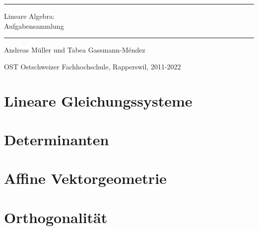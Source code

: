 \documentclass[a4paper,12pt]{book}
\begin{document}
\pagestyle{fancy}
\rhead{}
\frontmatter
\newcommand\HRule{\noindent\rule{\linewidth}{1.5pt}}
\begin{titlepage}
\HRule
\vspace*{2pt}
\begin{flushright}
{\Huge
Lineare Algebra:\\
\bigskip
Aufgabensammlung}
\end{flushright}
\HRule
\begin{flushright}
\vspace{30pt}
\LARGE
Andreas Müller
und
Tabea Gassmann-Méndez
\end{flushright}
\begin{center}
OST Ostschweizer Fachhochschule, Rapperswil, 2011-2022
\end{center}
\end{titlepage}
\tableofcontents
\newenvironment{beispiel}[1][Beispiel]{%
\begin{proof}[#1]%
\renewcommand{\qedsymbol}{$\bigcirc$}
}{\end{proof}}
\mainmatter
\makeatletter
\newcommand{\customlabel}[2]{%
\protected@write \@auxout {}{\string \newlabel {#1}{{#2}{}{}{}{}}}}
\makeatother

\def\gaussurl#1{
\edef\glnumber{\getrefnumber{#1}}
\url{https://linalg.ch/gauss/?id=\glnumber}}
%


\openthemaindex
{}
\allowdisplaybreaks
\chapter{Lineare Gleichungssysteme}

\chapter{Determinanten}

\chapter{Affine Vektorgeometrie}

\chapter{Orthogonalität}

\end{document}
